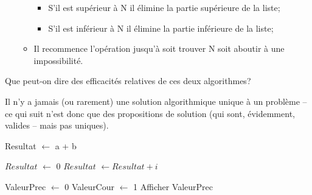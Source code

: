 \documentclass[12pt]{article}
\begin{document}
\begin{MonExo}
\begin{alphenum}
\begin{itemize}
\begin{itemize}
					\begin{itemize}
						\item S'il est supérieur à N il élimine la partie supérieure de la liste;
						\item S'il est inférieur à N il élimine la partie inférieure de la liste;
					\end{itemize}
					\item Il recommence l'opération jusqu'à soit trouver N soit aboutir à une impossibilité.
				\end{itemize}
			\end{itemize}
			Que peut-on dire des efficacités relatives de ces deux algorithmes?
		\end{alphenum}
	\end{MonExo}
	
	\begin{MaReponse}
		Il n'y a jamais (ou rarement) une solution algorithmique unique à un problème -- ce qui suit n'est donc que des propositions de solution (qui sont, évidemment, valides -- mais pas uniques).
		\begin{alphenum}
			\item
			\begin{algorithmic}[1]
				\State Resultat $\leftarrow$ a + b
				\State{}
				\EndFunction
			\end{algorithmic}
			\vspace{\baselineskip}
			\item
			\begin{algorithmic}[1]
				\State $Resultat$ $\leftarrow$ 0
				\State $Resultat$ $\leftarrow Resultat + i$
				\EndFor
				\State{}
				\EndFunction
			\end{algorithmic}
			\vspace{\baselineskip}
			\item
			\begin{algorithmic}[1]
				\State ValeurPrec $\leftarrow$ 0
				\State ValeurCour $\leftarrow$ 1
				\State Afficher ValeurPrec

\end{algorithmic}
\end{alphenum}
\end{MaReponse}
\end{document}
